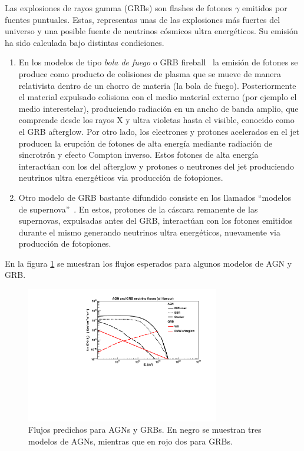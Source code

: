 	Las explosiones de rayos gamma (GRBs) son flashes de fotones $\gamma$ emitidos por fuentes puntuales.
	Estas, representas unas de las explosiones más fuertes del universo y una posible fuente de neutrinos c\'osmicos ultra energ\'eticos.
	Su emisi\'on ha sido calculada bajo distintas condiciones.
	\begin{enumerate}
	 \item En los modelos de tipo \emph{bola de fuego} o GRB fireball~\cite{cite:grb_Waxman1,cite:grb_Waxman2} la emisi\'on de fotones se produce como producto de colisiones de plasma que se mueve de manera relativista dentro de un chorro de materia (la bola de fuego).
	 Posteriormente el material expulsado colisiona con el medio material externo (por ejemplo el medio interestelar), produciendo radiaci\'on en un ancho de banda amplio, que comprende desde los rayos X y ultra violetas hasta el visible, conocido como el GRB afterglow.
	 Por otro lado, los electrones y protones acelerados en el jet producen la erupci\'on de fotones de alta energ\'ia mediante radiaci\'on de sincrotr\'on y efecto Compton inverso.
	 Estos fotones de alta energ\'ia interact\'uan con los del afterglow y protones o neutrones del jet produciendo neutrinos ultra energ\'eticos via producci\'on de fotopiones.
	 \item Otro modelo de GRB bastante difundido consiste en los llamados ``modelos de supernova''~\cite{cite:grb_Supernova}. 
	 En estos, protones de la cáscara remanente de las supernovas, expulsadas antes del GRB, interact\'uan con los fotones emitidos durante el mismo generando neutrinos ultra energ\'eticos, nuevamente via producci\'on de fotopiones.
	\end{enumerate}
	En la figura \ref{fig:flujosAGN} se muestran los flujos esperados para algunos modelos de AGN y GRB.
	\begin{figure}[ht]
		\begin{center}
		\includegraphics[width=0.75\textwidth]{fig/introduccion/AGN_GRB_nufluxes}
		\caption{\label{fig:flujosAGN} Flujos predichos para AGNs y GRBs. En negro se muestran tres modelos de AGNs\cite{cite:Mannheim1,cite:BBR,cite:SteckerAGN}, mientras que en rojo dos para GRBs\cite{cite:grb_Waxman2,cite:grb_Supernova}.}
		\end{center}
	\end{figure}
	
